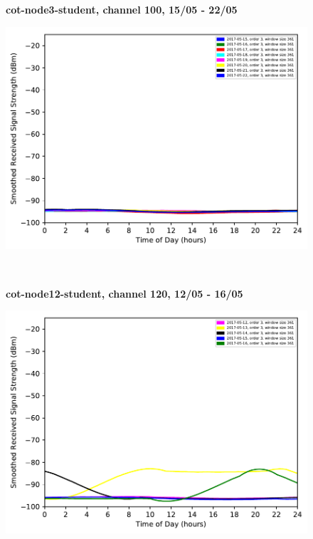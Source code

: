 \begin{figure}[h!]
    \centering
    \textbf{cot-node3-student, channel 100, 15/05 - 22/05}\par\medskip
	\includegraphics[scale=0.4]{images/5_GHz/cot-node3-student_2017-05-22_chan100_image.pdf}
\end{figure}\\
\begin{figure}[h!]
    \centering
    \textbf{cot-node12-student, channel 120, 12/05 - 16/05}\par\medskip
	\includegraphics[scale=0.4]{images/5_GHz/cot-node8-student_2017-05-16_chan120_image.pdf}
\end{figure}\\
